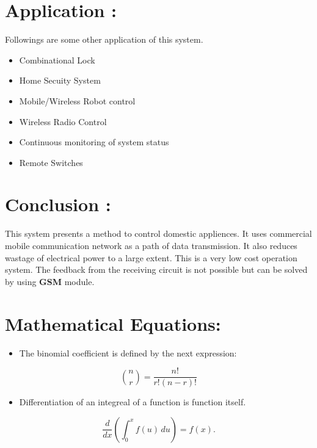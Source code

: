 \documentclass[11pt]{article}
\begin{document}
\section{Application :}
Followings are some other application of this system.
\begin{itemize}
	\item{Combinational Lock}
\end{itemize}
\begin{itemize}
	\item{Home Secuity System}
\end{itemize}
\begin{itemize}
	\item{Mobile/Wireless Robot control}
\end{itemize}
\begin{itemize}
	\item{Wireless Radio Control}
\end{itemize}
\begin{itemize}
	\item{Continuous monitoring of system status}
\end{itemize}
\begin{itemize}
	\item{Remote Switches}
\end{itemize}

\section{Conclusion :}
This system presents a method to control domestic appliences. It uses commercial mobile communication network as a path of data transmission. It also reduces wastage of electrical power to a large extent. This is a very low cost operation system. The feedback from the receiving circuit is not possible but can be solved by using \textbf{GSM} module.

\section{Mathematical Equations:}
\begin{itemize}
\item
The binomial coefficient is defined by the next expression:
\end{itemize}
$$
\binom{n}{r} = \frac{n!}{r!(n-r)!}
$$
\begin{itemize}
\item
Differentiation of an integreal of a function is function itself.
\end{itemize}
 $$
 \frac{d}{dx}\left( \int_{0}^{x} f(u)\,du\right)=f(x).
 $$
\end{document}
